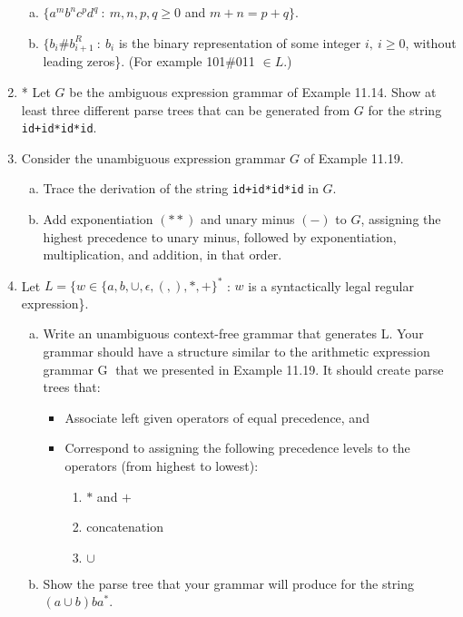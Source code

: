 \documentclass[10pt]{article}
\begin{document}
\begin{enumerate}[1)]
\begin{enumerate}[a)]
\item
$\{a^mb^nc^pd^q\ :\ m, n, p, q \geq 0$ and $m + n = p + q\}$.

\item
$\{b_i\#b_{i+1}^R\ :\ b_i$ is the binary representation of some integer  $i,\ i \geq 0$, without leading zeros\}. (For example 101\#011 $\in L$.)
\end{enumerate}

\item
* Let $G$ be the ambiguous expression grammar of Example 11.14.  Show at least three different parse trees that can be generated from $G$ for the string \texttt{id+id*id*id}.

\item
Consider the unambiguous expression grammar $G$ of Example 11.19.
\begin{enumerate}[a)]
\item
Trace the derivation of the string \texttt{id+id*id*id} in $G$.
\item
Add exponentiation $(**)$ and unary minus $(-)$ to  $G$, assigning the highest precedence to unary minus, followed by exponentiation, multiplication, and addition, in that order.
\end{enumerate}

\item
Let $L = \{w \in \{a, b, \cup, \epsilon, (, ), *, +\}^*$ : $w$ is a syntactically legal regular expression\}.  
\begin{enumerate}[a)]
\item
Write an  unambiguous context-free grammar that generates  L.  Your grammar should have a structure 
similar to the arithmetic expression grammar G that we presented in Example 11.19.  It should create parse 
trees that:
\begin{itemize}
\item
Associate left given operators of equal precedence, and
\item
Correspond to assigning the following precedence levels to the operators (from highest to lowest):
\begin{enumerate}[1)]
\item
$*$ and $+$

\item
concatenation

\item
$\cup$
\end{enumerate}
\end{itemize}
\item
Show the parse tree that your grammar will produce for the string $(a \cup b)ba^*$.
\end{enumerate}


\end{enumerate}
\end{document}
